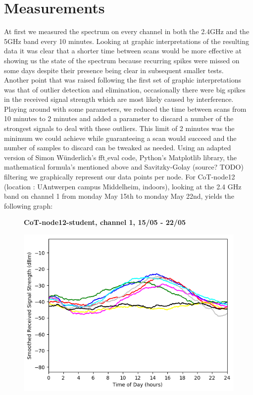 \documentclass[a4paper, 11pt]{article}
\begin{document}
\section{Measurements}
At first we measured the spectrum on every channel in both the 2.4GHz and the 5GHz band every 10 minutes. Looking at graphic interpretations of the resulting data it was clear that a shorter time between scans would be more effective at showing us the state of the spectrum because recurring spikes were missed on some days despite their presence being clear in subsequent smaller tests. \\
Another point that was raised following the first set of graphic interpretations was that of outlier detection and elimination, occasionally there were big spikes in the received signal strength which are most likely caused by interference.
Playing around with some parameters, we reduced the time between scans from 10 minutes to 2 minutes and added a parameter to discard a number of the strongest signals to deal with these outliers. This limit of 2 minutes was the minimum we could achieve while guaranteeing a scan would succeed and the number of samples to discard can be tweaked as needed.
Using an adapted version of Simon W{\"u}nderlich's fft$\_$eval code, Python's Matplotlib library, the mathematical formula's mentioned above and Savitzky-Golay (source? TODO) filtering we graphically represent our data points per node. For CoT-node12 (location : UAntwerpen campus Middelheim, indoors), looking at the 2.4 GHz band on channel 1 from monday May 15th to monday May 22nd, yields the following graph:\\
\begin{figure}[h!]
    \centering
    \textbf{CoT-node12-student, channel 1, 15/05 - 22/05}\par\medskip
	\includegraphics[scale=0.7]{images/2_4_GHz/cot-node12-student_2017-05-22_chan1_image.png}
\end{figure}
\end{document}
